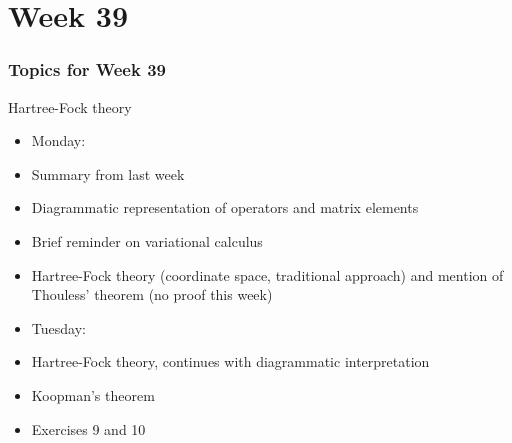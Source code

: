\section[Week 39]{Week 39}

\frame
{
  \frametitle{Topics for Week 39}
  \begin{block}{Hartree-Fock theory}
\begin{itemize}
\item Monday:
\item Summary from last week
\item Diagrammatic representation of operators and matrix elements
\item Brief reminder on variational calculus
\item Hartree-Fock theory (coordinate space, traditional approach) and mention of Thouless' theorem (no proof this week)
\item Tuesday:
\item Hartree-Fock theory, continues with diagrammatic interpretation
\item Koopman's theorem
\item Exercises 9 and 10 
\end{itemize}
  \end{block}
} 



